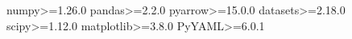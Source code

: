 numpy>=1.26.0
pandas>=2.2.0
pyarrow>=15.0.0
datasets>=2.18.0
scipy>=1.12.0
matplotlib>=3.8.0
PyYAML>=6.0.1
